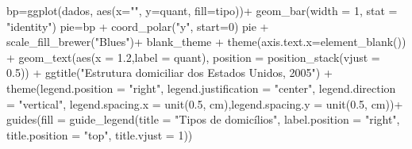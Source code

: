 \documentclass[
]{book}
\newenvironment{Shaded}{\begin{snugshade}}{\end{snugshade}}
\newcommand{\AttributeTok}[1]{\textcolor[rgb]{0.77,0.63,0.00}{#1}}
\newcommand{\DecValTok}[1]{\textcolor[rgb]{0.00,0.00,0.81}{#1}}
\newcommand{\FloatTok}[1]{\textcolor[rgb]{0.00,0.00,0.81}{#1}}
\newcommand{\FunctionTok}[1]{\textcolor[rgb]{0.00,0.00,0.00}{#1}}
\newcommand{\NormalTok}[1]{#1}
\newcommand{\OtherTok}[1]{\textcolor[rgb]{0.56,0.35,0.01}{#1}}
\newcommand{\SpecialCharTok}[1]{\textcolor[rgb]{0.00,0.00,0.00}{#1}}
\newcommand{\StringTok}[1]{\textcolor[rgb]{0.31,0.60,0.02}{#1}}
\begin{document}
\begin{Shaded}
\begin{Highlighting}[]
\NormalTok{bp}\OtherTok{=}\FunctionTok{ggplot}\NormalTok{(dados, }\FunctionTok{aes}\NormalTok{(}\AttributeTok{x=}\StringTok{""}\NormalTok{, }\AttributeTok{y=}\NormalTok{quant, }\AttributeTok{fill=}\NormalTok{tipo))}\SpecialCharTok{+}
  \FunctionTok{geom\_bar}\NormalTok{(}\AttributeTok{width =} \DecValTok{1}\NormalTok{, }\AttributeTok{stat =} \StringTok{"identity"}\NormalTok{)}
\NormalTok{pie}\OtherTok{=}\NormalTok{bp }\SpecialCharTok{+} \FunctionTok{coord\_polar}\NormalTok{(}\StringTok{"y"}\NormalTok{, }\AttributeTok{start=}\DecValTok{0}\NormalTok{)}
\NormalTok{pie }\SpecialCharTok{+} 
  \FunctionTok{scale\_fill\_brewer}\NormalTok{(}\StringTok{"Blues"}\NormalTok{)}\SpecialCharTok{+}
\NormalTok{  blank\_theme }\SpecialCharTok{+}
  \FunctionTok{theme}\NormalTok{(}\AttributeTok{axis.text.x=}\FunctionTok{element\_blank}\NormalTok{()) }\SpecialCharTok{+}
  \FunctionTok{geom\_text}\NormalTok{(}\FunctionTok{aes}\NormalTok{(}\AttributeTok{x =}  \FloatTok{1.2}\NormalTok{,}\AttributeTok{label =}\NormalTok{ quant), }\AttributeTok{position =} \FunctionTok{position\_stack}\NormalTok{(}\AttributeTok{vjust =} \FloatTok{0.5}\NormalTok{)) }\SpecialCharTok{+}
  \FunctionTok{ggtitle}\NormalTok{(}\StringTok{"Estrutura domiciliar dos Estados Unidos, 2005"}\NormalTok{) }\SpecialCharTok{+}
  \FunctionTok{theme}\NormalTok{(}\AttributeTok{legend.position =} \StringTok{"right"}\NormalTok{, }\AttributeTok{legend.justification =} \StringTok{"center"}\NormalTok{, }\AttributeTok{legend.direction =} \StringTok{"vertical"}\NormalTok{,}
        \AttributeTok{legend.spacing.x =} \FunctionTok{unit}\NormalTok{(}\FloatTok{0.5}\NormalTok{, }\StringTok{\textquotesingle{}cm\textquotesingle{}}\NormalTok{),}\AttributeTok{legend.spacing.y =} \FunctionTok{unit}\NormalTok{(}\FloatTok{0.5}\NormalTok{, }\StringTok{\textquotesingle{}cm\textquotesingle{}}\NormalTok{))}\SpecialCharTok{+}
  \FunctionTok{guides}\NormalTok{(}\AttributeTok{fill =} \FunctionTok{guide\_legend}\NormalTok{(}\AttributeTok{title =} \StringTok{"Tipos de domicílios"}\NormalTok{,}
                             \AttributeTok{label.position =} \StringTok{"right"}\NormalTok{,}
                             \AttributeTok{title.position =} \StringTok{"top"}\NormalTok{, }\AttributeTok{title.vjust =} \DecValTok{1}\NormalTok{)) }
\end{Highlighting}
\end{Shaded}
\end{document}

